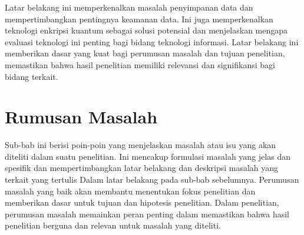 \vspace{5mm}
Latar belakang ini memperkenalkan masalah penyimpanan data dan mempertimbangkan pentingnya keamanan data. Ini juga memperkenalkan teknologi enkripsi kuantum sebagai solusi potensial dan menjelaskan mengapa evaluasi teknologi ini penting bagi bidang teknologi informasi. Latar belakang ini memberikan dasar yang kuat bagi perumusan masalah dan tujuan penelitian, memastikan bahwa hasil penelitian memiliki relevansi dan signifikansi bagi bidang terkait.

\section{Rumusan Masalah}

Sub-bab ini berisi poin-poin yang menjelaskan masalah atau isu yang akan diteliti dalam suatu penelitian. Ini mencakup formulasi masalah yang jelas dan spesifik dan 
mempertimbangkan latar belakang dan deskripsi masalah yang terkait yang tertulis Dalam latar belakang pada sub-bab sebelumnya. Perumusan masalah yang baik akan membantu menentukan fokus penelitian dan memberikan dasar untuk tujuan dan hipotesis penelitian. Dalam penelitian, perumusan masalah memainkan peran penting dalam memastikan bahwa hasil penelitian berguna dan relevan untuk masalah yang diteliti.

\noindent{}

